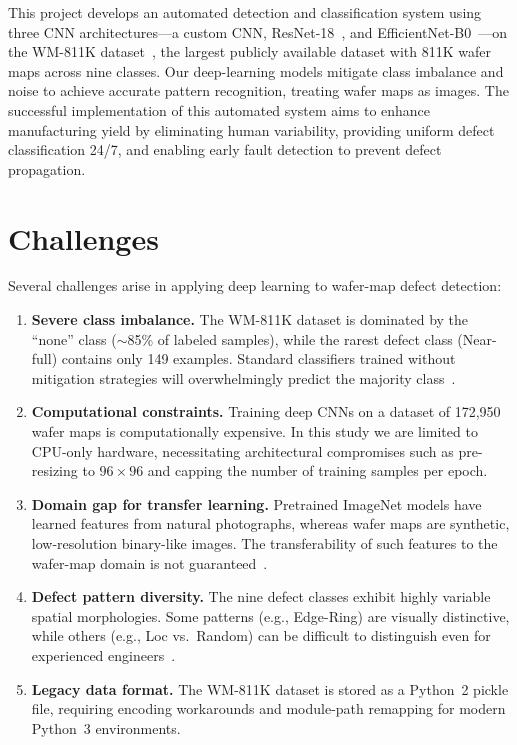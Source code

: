 \documentclass[conference]{IEEEtran}
\begin{document}
This project develops an automated detection and classification system using
three CNN architectures---a custom CNN, ResNet-18~\cite{he2016}, and
EfficientNet-B0~\cite{tan2019}---on the WM-811K dataset~\cite{wu2015}, the
largest publicly available dataset with 811K wafer maps across nine classes.
Our deep-learning models mitigate class imbalance and noise to achieve
accurate pattern recognition, treating wafer maps as images. The successful
implementation of this automated system aims to enhance manufacturing yield by
eliminating human variability, providing uniform defect classification 24/7,
and enabling early fault detection to prevent defect propagation.

\section{Challenges}
\label{sec:challenges}

Several challenges arise in applying deep learning to wafer-map defect
detection:

\begin{enumerate}
    \item \textbf{Severe class imbalance.} The WM-811K dataset is dominated by
          the ``none'' class ($\sim$85\% of labeled samples), while the rarest
          defect class (Near-full) contains only 149 examples. Standard
          classifiers trained without mitigation strategies will overwhelmingly
          predict the majority class~\cite{he2009}.

    \item \textbf{Computational constraints.} Training deep CNNs on a dataset
          of 172{,}950 wafer maps is computationally expensive. In this study
          we are limited to CPU-only hardware, necessitating architectural
          compromises such as pre-resizing to $96 \times 96$ and capping the
          number of training samples per epoch.

    \item \textbf{Domain gap for transfer learning.} Pretrained ImageNet
          models have learned features from natural photographs, whereas wafer
          maps are synthetic, low-resolution binary-like images. The
          transferability of such features to the wafer-map domain is not
          guaranteed~\cite{yosinski2014}.

    \item \textbf{Defect pattern diversity.} The nine defect classes exhibit
          highly variable spatial morphologies. Some patterns (e.g., Edge-Ring)
          are visually distinctive, while others (e.g., Loc vs.\ Random) can be
          difficult to distinguish even for experienced
          engineers~\cite{chen2023}.

    \item \textbf{Legacy data format.} The WM-811K dataset is stored as a
          Python~2 pickle file, requiring encoding workarounds and module-path
          remapping for modern Python~3 environments.
\end{enumerate}
\end{document}
